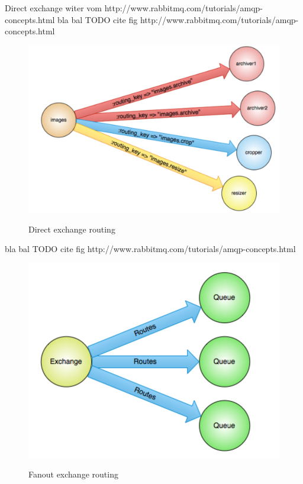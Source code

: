 Direct exchange witer vom http://www.rabbitmq.com/tutorials/amqp-concepts.html
bla bal TODO cite fig http://www.rabbitmq.com/tutorials/amqp-concepts.html
\begin{figure}[htb]
  \centering
  \includegraphics[scale=0.6]{rabbit_mq_direct.png}\\
  \caption{Direct exchange routing}
  \label{fig:rabbit_mq_direct}
\end{figure}


bla bal TODO cite fig http://www.rabbitmq.com/tutorials/amqp-concepts.html
\begin{figure}[htb]
  \centering
  \includegraphics[scale=0.6]{rabbit_mq_fanout.png}\\
  \caption{Fanout exchange routing}
  \label{fig:rabbit_mq_fanout}
\end{figure}

